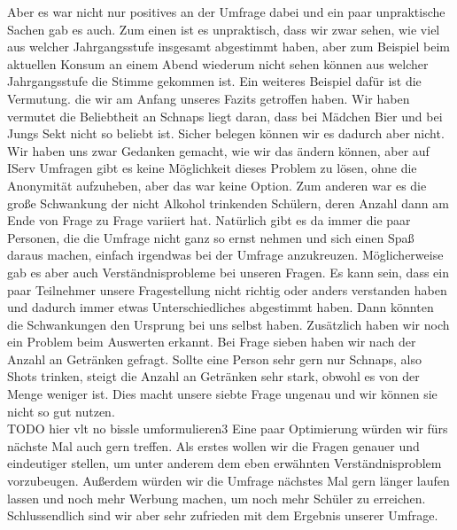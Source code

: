 \documentclass[12pt]{article}
\begin{document}
Aber es war nicht nur positives an der Umfrage dabei und ein paar unpraktische Sachen gab es auch. Zum einen ist es unpraktisch, dass wir zwar sehen, wie viel aus welcher Jahrgangsstufe insgesamt abgestimmt haben, aber zum Beispiel beim aktuellen Konsum an einem Abend wiederum nicht sehen können aus welcher Jahrgangsstufe die Stimme gekommen ist. Ein weiteres Beispiel dafür ist die Vermutung. die wir am Anfang unseres Fazits getroffen haben. Wir haben vermutet die Beliebtheit an Schnaps liegt daran, dass bei Mädchen Bier und bei Jungs Sekt nicht so beliebt ist. Sicher belegen können wir es dadurch aber nicht. Wir haben uns zwar Gedanken gemacht, wie wir das ändern können, aber auf IServ Umfragen gibt es keine Möglichkeit dieses Problem zu lösen, ohne die Anonymität aufzuheben, aber das war keine Option. Zum anderen war es die große Schwankung der nicht Alkohol trinkenden Schülern, deren Anzahl dann am Ende von Frage zu Frage variiert hat. Natürlich gibt es da immer die paar Personen, die die Umfrage nicht ganz so ernst nehmen und sich einen Spaß daraus machen, einfach irgendwas bei der Umfrage anzukreuzen. Möglicherweise gab es aber auch Verständnisprobleme bei unseren Fragen. Es kann sein, dass ein paar Teilnehmer unsere Fragestellung nicht richtig oder anders verstanden haben und dadurch immer etwas Unterschiedliches abgestimmt haben. Dann könnten die Schwankungen den Ursprung bei uns selbst haben. Zusätzlich haben wir noch ein Problem beim Auswerten erkannt. Bei Frage sieben haben wir nach der Anzahl an Getränken gefragt. Sollte eine Person sehr gern nur Schnaps, also Shots trinken, steigt die Anzahl an Getränken sehr stark, obwohl es von der Menge weniger ist. Dies macht unsere siebte Frage ungenau und wir können sie nicht so gut nutzen.\\
TODO hier vlt no bissle umformulieren3
Eine paar Optimierung würden wir fürs nächste Mal auch gern treffen. Als erstes wollen wir die Fragen genauer und eindeutiger stellen, um unter anderem dem eben erwähnten Verständnisproblem vorzubeugen. Außerdem würden wir die Umfrage nächstes Mal gern länger laufen lassen und noch mehr Werbung machen, um noch mehr Schüler zu erreichen. 
Schlussendlich sind wir aber sehr zufrieden mit dem Ergebnis unserer Umfrage. 
\end{document}
